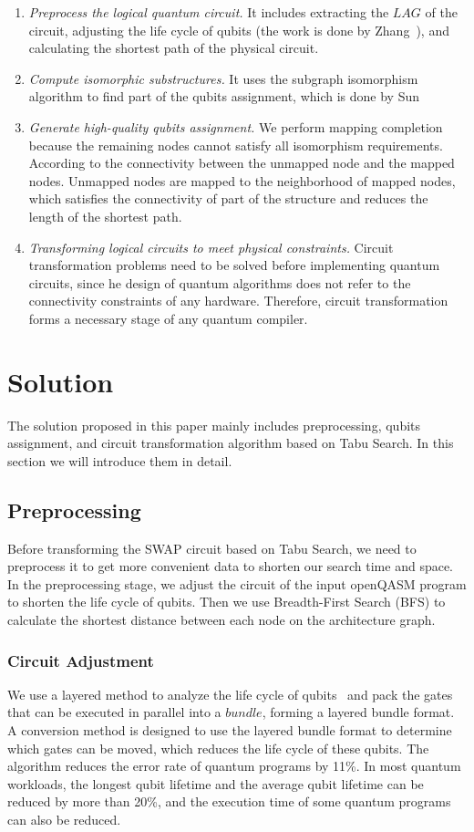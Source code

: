 \documentclass[runningheads]{llncs}
\begin{document}
\begin{enumerate}
	\item \emph{ Preprocess the logical quantum circuit.} 
	It includes extracting the $LAG$ of the circuit, adjusting the life cycle of qubits (the work is done by Zhang~\cite{2019Zhang}),  and calculating the shortest path of the physical circuit.
	\item \emph{Compute isomorphic substructures.}
	It uses the subgraph isomorphism algorithm to find part of the qubits assignment, which is done by Sun~\cite{Sun2020}   
	\item \emph{Generate high-quality qubits assignment.} We perform mapping completion because the remaining nodes cannot satisfy all isomorphism requirements. According to the connectivity between the unmapped node and the mapped nodes. Unmapped nodes are mapped to the neighborhood of mapped nodes, which satisfies the connectivity of part of the structure and reduces the length of the shortest path.  
	\item \emph{Transforming logical circuits to meet physical constraints.}
	Circuit transformation problems need to be solved before implementing quantum circuits, since he design of quantum algorithms does not refer to the connectivity constraints of any hardware. Therefore, circuit transformation forms a necessary stage of any quantum compiler.
\end{enumerate}

\section{Solution}
\label{Solution}
The solution proposed in this paper mainly includes preprocessing, qubits assignment, and circuit transformation algorithm based on Tabu Search. In this section we will introduce them in detail.
\subsection{Preprocessing}
Before transforming the SWAP circuit based on Tabu Search, we need to preprocess it to get more convenient data to shorten our search time and space. In the preprocessing stage, we adjust the circuit of the input openQASM program to shorten the life cycle of qubits. Then we use Breadth-First Search (BFS) to calculate the shortest distance between each node on the architecture graph.
\subsubsection{Circuit Adjustment}
We use a layered method to analyze the life cycle of qubits~\cite{2019Zhang} and pack the gates that can be executed in parallel into a $bundle$, forming a layered bundle format.
A conversion method is designed to use the layered bundle format to determine which gates can be moved, which reduces the life cycle of these qubits. The algorithm reduces the error rate of quantum programs by 11\%. In most quantum workloads, the longest qubit lifetime and the average qubit lifetime can be reduced by more than 20\%, and the execution time of some quantum programs can also be reduced.
\end{document}
